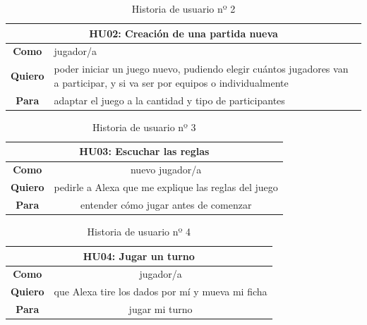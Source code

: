 \begin{table}[H]
	\centering
	\begin{tabular}{|c|p{14cm}|}
		\hline
		\multicolumn{2}{|c|}{\textbf{HU02}: Creación de una partida nueva} \\
		\hline
		\textbf{Como} & jugador/a \\
		\hline
		\textbf{Quiero} & poder iniciar un juego nuevo, pudiendo elegir cuántos jugadores van a participar, y si va ser por equipos o individualmente \\
		\hline
		\textbf{Para} & adaptar el juego a la cantidad y tipo de participantes \\
		\hline
	\end{tabular}
	\caption{Historia de usuario nº 2}
	\label{tab:HU02}
\end{table}

\begin{table}[H]
    \centering
    \begin{tabular}{|c|c|}
        \hline
        \multicolumn{2}{|c|}{\textbf{HU03}: Escuchar las reglas} \\
        \hline
        \textbf{Como} & nuevo jugador/a \\
        \hline
        \textbf{Quiero} & pedirle a Alexa que me explique las reglas del juego \\
        \hline
        \textbf{Para} & entender cómo jugar antes de comenzar \\
        \hline
    \end{tabular}
    \caption{Historia de usuario nº 3}
    \label{tab:HU03}
\end{table}

\begin{table}[H]
    \centering
    \begin{tabular}{|c|c|}
        \hline
        \multicolumn{2}{|c|}{\textbf{HU04}: Jugar un turno} \\
        \hline
        \textbf{Como} & jugador/a \\
        \hline
        \textbf{Quiero} & que Alexa tire los dados por mí y mueva mi ficha \\
        \hline
        \textbf{Para} & jugar mi turno \\
        \hline
    \end{tabular}
    \caption{Historia de usuario nº 4}
    \label{tab:HU04}
\end{table}

